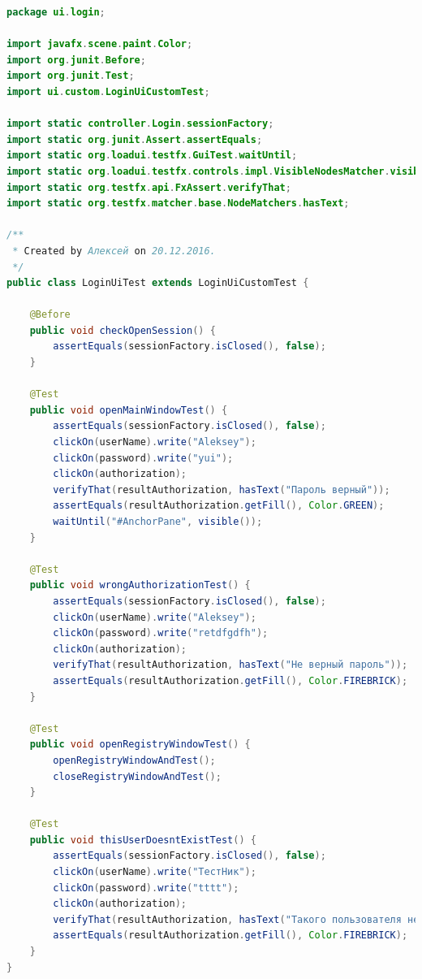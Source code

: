 \documentclass[a4paper,12pt]{article}
\begin{document}
\begin{lstlisting}[language=java, caption=код модуля LoginUiTest.java]
package ui.login;

import javafx.scene.paint.Color;
import org.junit.Before;
import org.junit.Test;
import ui.custom.LoginUiCustomTest;

import static controller.Login.sessionFactory;
import static org.junit.Assert.assertEquals;
import static org.loadui.testfx.GuiTest.waitUntil;
import static org.loadui.testfx.controls.impl.VisibleNodesMatcher.visible;
import static org.testfx.api.FxAssert.verifyThat;
import static org.testfx.matcher.base.NodeMatchers.hasText;

/**
 * Created by Алексей on 20.12.2016.
 */
public class LoginUiTest extends LoginUiCustomTest {

    @Before
    public void checkOpenSession() {
        assertEquals(sessionFactory.isClosed(), false);
    }

    @Test
    public void openMainWindowTest() {
        assertEquals(sessionFactory.isClosed(), false);
        clickOn(userName).write("Aleksey");
        clickOn(password).write("yui");
        clickOn(authorization);
        verifyThat(resultAuthorization, hasText("Пароль верный"));
        assertEquals(resultAuthorization.getFill(), Color.GREEN);
        waitUntil("#AnchorPane", visible());
    }

    @Test
    public void wrongAuthorizationTest() {
        assertEquals(sessionFactory.isClosed(), false);
        clickOn(userName).write("Aleksey");
        clickOn(password).write("retdfgdfh");
        clickOn(authorization);
        verifyThat(resultAuthorization, hasText("Не верный пароль"));
        assertEquals(resultAuthorization.getFill(), Color.FIREBRICK);
    }

    @Test
    public void openRegistryWindowTest() {
        openRegistryWindowAndTest();
        closeRegistryWindowAndTest();
    }

    @Test
    public void thisUserDoesntExistTest() {
        assertEquals(sessionFactory.isClosed(), false);
        clickOn(userName).write("ТестНик");
        clickOn(password).write("tttt");
        clickOn(authorization);
        verifyThat(resultAuthorization, hasText("Такого пользователя не существует"));
        assertEquals(resultAuthorization.getFill(), Color.FIREBRICK);
    }
}
\end{lstlisting}
\end{document}
